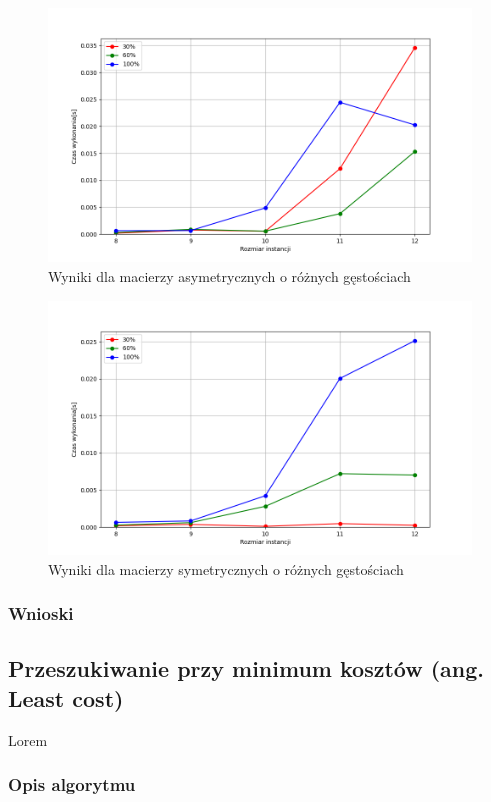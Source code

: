 \documentclass{article}
\begin{document}
  \begin{figure}[ht]
    \centering
    \includegraphics[width=\textwidth]{src/plots/asymdfsresoult.png}
    \caption{Wyniki dla macierzy asymetrycznych o różnych gęstościach}
    \label{fig:asm_df}
  \end{figure}
  \begin{figure}[ht]
    \centering
    \includegraphics[width=\textwidth]{src/plots/symdfsresoult.png}
    \caption{Wyniki dla macierzy symetrycznych o różnych gęstościach}
    \label{fig:sm_df}
  \end{figure}
  \FloatBarrier
  \subsubsection{Wnioski}

  \subsection{Przeszukiwanie przy minimum kosztów (ang. Least cost)}
  Lorem
  \subsubsection{Opis algorytmu}
\end{document}
